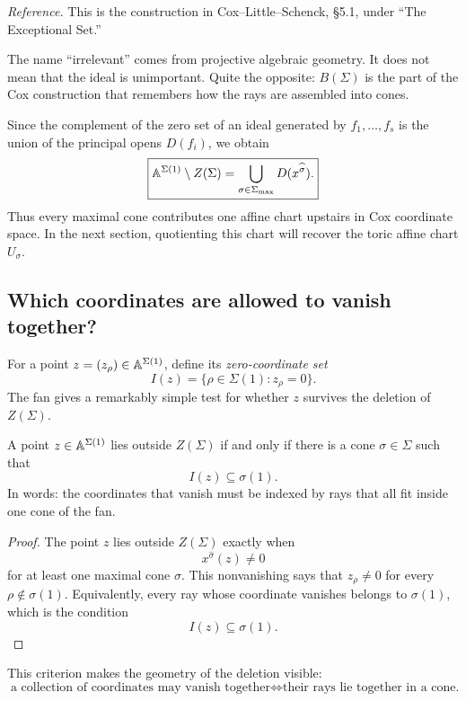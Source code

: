 \noindent
\textit{Reference.}
This is the construction in Cox--Little--Schenck, \S5.1, under
``The Exceptional Set.''

The name ``irrelevant'' comes from projective algebraic geometry. It
does not mean that the ideal is unimportant. Quite the opposite:
\(B(\Sigma)\) is the part of the Cox construction that remembers how
the rays are assembled into cones.

Since the complement of the zero set of an ideal generated by
\(f_1,\dots,f_s\) is the union of the principal opens \(D(f_i)\), we
obtain
\[
\boxed{
\mathbb{A}^{\Sigma(1)}\setminus Z(\Sigma)
=
\bigcup_{\sigma\in\Sigma_{\max}}
D(x^{\widehat\sigma}).
}
\]
Thus every maximal cone contributes one affine chart upstairs in Cox
coordinate space. In the next section, quotienting this chart will
recover the toric affine chart \(U_\sigma\).

\subsection{Which coordinates are allowed to vanish together?}

For a point \(z=(z_\rho)\in\mathbb{A}^{\Sigma(1)}\), define its
\emph{zero-coordinate set}
\[
I(z)=\{\rho\in\Sigma(1):z_\rho=0\}.
\]
The fan gives a remarkably simple test for whether \(z\) survives the
deletion of \(Z(\Sigma)\).

\begin{proposition}
\label{prop:cone-test-cox-coordinates}
A point \(z\in\mathbb{A}^{\Sigma(1)}\) lies outside \(Z(\Sigma)\) if and
only if there is a cone \(\sigma\in\Sigma\) such that
\[
\boxed{
I(z)\subseteq\sigma(1).
}
\]
In words: the coordinates that vanish must be indexed by rays that all
fit inside one cone of the fan.
\end{proposition}

\begin{proof}
The point \(z\) lies outside \(Z(\Sigma)\) exactly when
\[
x^{\widehat\sigma}(z)\neq0
\]
for at least one maximal cone \(\sigma\). This nonvanishing says that
\(z_\rho\neq0\) for every \(\rho\notin\sigma(1)\). Equivalently, every
ray whose coordinate vanishes belongs to \(\sigma(1)\), which is the
condition
\[
I(z)\subseteq\sigma(1).
\]
\end{proof}

This criterion makes the geometry of the deletion visible:
\[
\boxed{
\text{a collection of coordinates may vanish together}
\iff
\text{their rays lie together in a cone.}
}
\]

